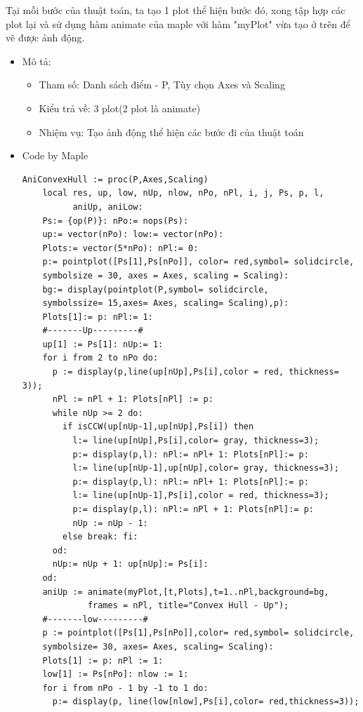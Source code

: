 \documentclass[12pt]{article}
\begin{document}
        Tại mỗi bước của thuật toán, ta tạo 1 plot thể hiện bước đó, xong tập hợp các plot lại và sử dụng hàm animate của maple với hàm "myPlot" vừa tạo ở trên 
        để vẽ được ảnh động.
        \begin{itemize}
          \item Mô tả:
          \begin{itemize}
            \item Tham số: Danh sách điểm - P, Tùy chọn Axes và Scaling 
            \item Kiểu trả về: 3 plot(2 plot là animate) 
            \item Nhiệm vụ: Tạo ảnh động thể hiện các bước đi của thuật toán
          \end{itemize}
          \item Code by Maple
            \footnotesize
            \begin{Verbatim}[frame=single]
  AniConvexHull := proc(P,Axes,Scaling)
    local res, up, low, nUp, nlow, nPo, nPl, i, j, Ps, p, l, 
          aniUp, aniLow:
    Ps:= {op(P)}: nPo:= nops(Ps):
    up:= vector(nPo): low:= vector(nPo):
    Plots:= vector(5*nPo): nPl:= 0:
    p:= pointplot([Ps[1],Ps[nPo]], color= red,symbol= solidcircle,
    symbolsize = 30, axes = Axes, scaling = Scaling):
    bg:= display(pointplot(P,symbol= solidcircle, 
    symbolssize= 15,axes= Axes, scaling= Scaling),p):
    Plots[1]:= p: nPl:= 1:
    #-------Up---------#
    up[1] := Ps[1]: nUp:= 1:
    for i from 2 to nPo do:
      p := display(p,line(up[nUp],Ps[i],color = red, thickness= 3));
      nPl := nPl + 1: Plots[nPl] := p:
      while nUp >= 2 do:
        if isCCW(up[nUp-1],up[nUp],Ps[i]) then
          l:= line(up[nUp],Ps[i],color= gray, thickness=3);
          p:= display(p,l): nPl:= nPl+ 1: Plots[nPl]:= p:
          l:= line(up[nUp-1],up[nUp],color= gray, thickness=3);
          p:= display(p,l): nPl:= nPl+ 1: Plots[nPl]:= p:
          l:= line(up[nUp-1],Ps[i],color = red, thickness=3);
          p:= display(p,l): nPl:= nPl + 1: Plots[nPl]:= p:
          nUp := nUp - 1:
        else break: fi:
      od:
      nUp:= nUp + 1: up[nUp]:= Ps[i]:
    od:
    aniUp := animate(myPlot,[t,Plots],t=1..nPl,background=bg, 
             frames = nPl, title="Convex Hull - Up");
    #-------low---------#
    p := pointplot([Ps[1],Ps[nPo]],color= red,symbol= solidcircle, 
    symbolsize= 30, axes= Axes, scaling= Scaling):
    Plots[1] := p: nPl := 1:
    low[1] := Ps[nPo]: nlow := 1:
    for i from nPo - 1 by -1 to 1 do:
      p:= display(p, line(low[nlow],Ps[i],color= red,thickness=3));

\end{Verbatim}
\end{itemize}
\end{document}
